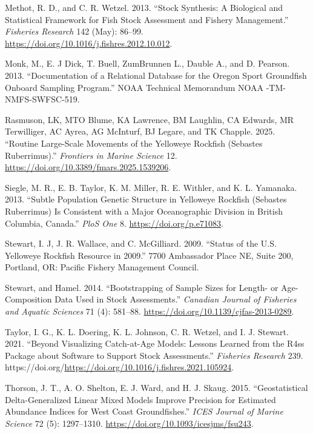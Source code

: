 \documentclass[
]{scrartcl}
\newlength{\cslhangindent}
\newenvironment{CSLReferences}[2] %
 {\begin{list}{}{%
  \setlength{\itemindent}{0pt}
  \setlength{\leftmargin}{0pt}
  \setlength{\parsep}{0pt}
  \ifodd #1
   \setlength{\leftmargin}{\cslhangindent}
   \setlength{\itemindent}{-1\cslhangindent}
  \fi
  \setlength{\itemsep}{#2\baselineskip}}}
 {\end{list}}
\begin{document}
\begin{CSLReferences}{1}{0}
Methot, R. D., and C. R. Wetzel. 2013. {``Stock Synthesis: A Biological
and Statistical Framework for Fish Stock Assessment and Fishery
Management.''} \emph{Fisheries Research} 142 (May): 86--99.
\url{https://doi.org/10.1016/j.fishres.2012.10.012}.

Monk, M., E. J Dick, T. Buell, ZumBrunnen L., Dauble A., and D. Pearson.
2013. {``Documentation of a Relational Database for the Oregon Sport
Groundfish Onboard Sampling Program.''} NOAA Technical Memorandum NOAA
-TM-NMFS-SWFSC-519.

Rasmuson, LK, MTO Blume, KA Lawrence, BM Laughlin, CA Edwards, MR
Terwilliger, AC Ayrea, AG McInturf, BJ Legare, and TK Chapple. 2025.
{``Routine Large-Scale Movements of the Yelloweye Rockfish (Sebastes
Ruberrimus).''} \emph{Frontiers in Marine Science} 12.
\url{https://doi.org/10.3389/fmars.2025.1539206}.

Siegle, M. R., E. B. Taylor, K. M. Miller, R. E. Withler, and K. L.
Yamanaka. 2013. {``Subtle Population Genetic Structure in Yelloweye
Rockfish (Sebastes Ruberrimus) Is Consistent with a Major Oceanographic
Division in British Columbia, Canada.''} \emph{PloS One} 8.
\url{https://doi.org/p.e71083}.

Stewart, I. J, J. R. Wallace, and C. McGilliard. 2009. {``Status of the
{U}.{S}. Yelloweye Rockfish Resource in 2009.''} 7700 Ambassador Place
NE, Suite 200, Portland, OR: Pacific Fishery Management Council.

Stewart, and Hamel. 2014. {``Bootstrapping of Sample Sizes for Length-
or Age-Composition Data Used in Stock Assessments.''} \emph{Canadian
Journal of Fisheries and Aquatic Sciences} 71 (4): 581--88.
\url{https://doi.org/10.1139/cjfas-2013-0289}.

Taylor, I. G., K. L. Doering, K. L. Johnson, C. R. Wetzel, and I. J.
Stewart. 2021. {``Beyond Visualizing Catch-at-Age Models: Lessons
Learned from the R4ss Package about Software to Support Stock
Assessments.''} \emph{Fisheries Research} 239.
https://doi.org/\url{https://doi.org/10.1016/j.fishres.2021.105924}.

Thorson, J. T., A. O. Shelton, E. J. Ward, and H. J. Skaug. 2015.
{``Geostatistical Delta-Generalized Linear Mixed Models Improve
Precision for Estimated Abundance Indices for {West} {Coast}
Groundfishes.''} \emph{ICES Journal of Marine Science} 72 (5):
1297--1310. \url{https://doi.org/10.1093/icesjms/fsu243}.


\end{CSLReferences}
\end{document}
